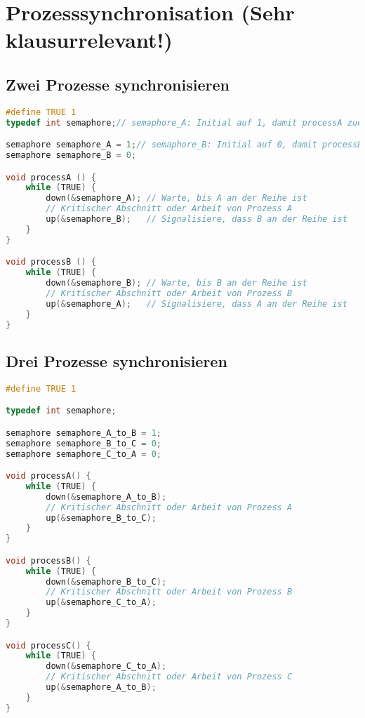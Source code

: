 \chapter{Prozesssynchronisation (Sehr klausurrelevant!)}

\section{Zwei Prozesse synchronisieren}

\begin{lstlisting}[language=C]
#define TRUE 1
typedef int semaphore;// semaphore_A: Initial auf 1, damit processA zuerst starten kann

semaphore semaphore_A = 1;// semaphore_B: Initial auf 0, damit processB warten muss
semaphore semaphore_B = 0;

void processA () {
    while (TRUE) {
        down(&semaphore_A); // Warte, bis A an der Reihe ist
        // Kritischer Abschnitt oder Arbeit von Prozess A
        up(&semaphore_B);   // Signalisiere, dass B an der Reihe ist
    }
}

void processB () {
    while (TRUE) {
        down(&semaphore_B); // Warte, bis B an der Reihe ist
        // Kritischer Abschnitt oder Arbeit von Prozess B
        up(&semaphore_A);   // Signalisiere, dass A an der Reihe ist
    }
}
\end{lstlisting}

\newpage

\section{Drei Prozesse synchronisieren}

\begin{lstlisting}[language=C]
#define TRUE 1

typedef int semaphore;

semaphore semaphore_A_to_B = 1;
semaphore semaphore_B_to_C = 0;
semaphore semaphore_C_to_A = 0;

void processA() {
    while (TRUE) {
        down(&semaphore_A_to_B);
        // Kritischer Abschnitt oder Arbeit von Prozess A
        up(&semaphore_B_to_C);
    }
}

void processB() {
    while (TRUE) {
        down(&semaphore_B_to_C);        
        // Kritischer Abschnitt oder Arbeit von Prozess B      
        up(&semaphore_C_to_A);
    }
}

void processC() {
    while (TRUE) {
        down(&semaphore_C_to_A);
        // Kritischer Abschnitt oder Arbeit von Prozess C
        up(&semaphore_A_to_B);
    }
}
\end{lstlisting}

